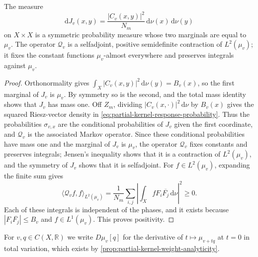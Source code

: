 \begin{lemma}\label{lem:coherent-kernel-markov}
The measure
\begin{equation}\label{eq:coherent-kernel-coupling}
 \mathrm{d}J_v(x,y)=\frac{|C_v(x,y)|^2}{N_m}
                         \,\mathrm{d}\nu(x)\,\mathrm{d}\nu(y)
\end{equation}
on $X\times X$ is a symmetric probability measure whose two marginals are equal to $\mu_v$. The operator $\mathcal Q_v$ is a selfadjoint, positive semidefinite contraction of $L^2(\mu_v)$; it fixes the constant functions $\mu_v$-almost everywhere and preserves integrals against $\mu_v$.
\end{lemma}
\begin{proof}
Orthonormality gives $\int_X|C_v(x,y)|^2\,\mathrm{d}\nu(y)=B_v(x)$, so the first marginal of $J_v$ is $\mu_v$. By symmetry so is the second, and the total mass identity shows that $J_v$ has mass one. Off $Z_m$, dividing $|C_v(x,\cdot)|^2\,\mathrm{d}\nu$ by $B_v(x)$ gives the squared Riesz-vector density in \eqref{eq:partial-kernel-response-probability}. Thus the probabilities $\sigma_{v,x}$ are the conditional probabilities of $J_v$ given the first coordinate, and $\mathcal Q_v$ is the associated Markov operator. Since these conditional probabilities have mass one and the marginal of $J_v$ is $\mu_v$, the operator $\mathcal Q_v$ fixes constants and preserves integrals; Jensen's inequality shows that it is a contraction of $L^2(\mu_v)$, and the symmetry of $J_v$ shows that it is selfadjoint. For $f\in L^2(\mu_v)$, expanding the finite sum gives
\[
 \langle\mathcal Q_v f,f\rangle_{L^2(\mu_v)}
 =\frac1{N_m}\sum_{i,j}
       \left|\int_X fF_i\overline{F_j}\,\mathrm{d}\nu\right|^2\geq0.
\]
Each of these integrals is independent of the phases, and it exists because $|F_i\overline{F_j}|\leq B_v$ and $f\in L^1(\mu_v)$. This proves positivity.
\end{proof}

For $v,q\in C(X,\mathbb R)$ we write $D\mu_v[q]$ for the derivative of $t\mapsto\mu_{v+tq}$ at $t=0$ in total variation, which exists by \cref{prop:partial-kernel-weight-analyticity}.

